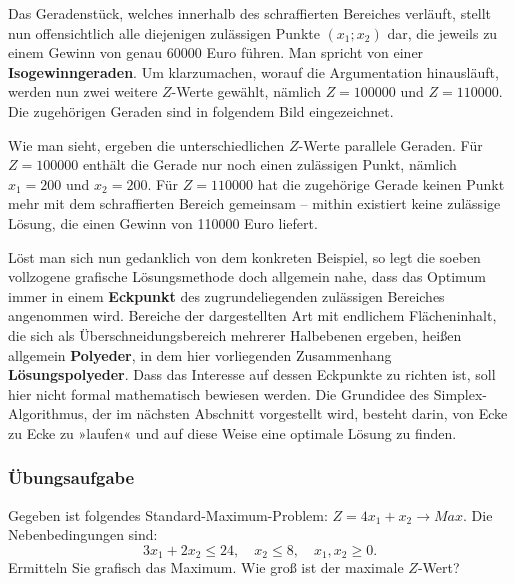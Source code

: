 Das Geradenstück, welches innerhalb des schraffierten Bereiches verläuft, stellt nun offensichtlich alle diejenigen zulässigen Punkte $(x_1; x_2)$ dar, die jeweils zu einem Gewinn von genau 60000 Euro führen. Man spricht von einer \textbf{Isogewinngeraden}. Um klarzumachen, worauf die Argumentation hinausläuft, werden nun zwei weitere $Z$-Werte gewählt, nämlich $Z = 100000$ und $Z = 110000$. Die zugehörigen Geraden sind in folgendem Bild eingezeichnet.

Wie man sieht, ergeben die unterschiedlichen $Z$-Werte parallele Geraden. Für $Z = 100000$ enthält die Gerade nur noch einen zulässigen Punkt, nämlich $x_1 = 200$ und $x_2 = 200$. Für $Z = 110000$ hat die zugehörige Gerade keinen Punkt mehr mit dem schraffierten Bereich gemeinsam -- mithin existiert keine zulässige Lösung, die einen Gewinn von 110000 Euro liefert.

\beispielende

Löst man sich nun gedanklich von dem konkreten Beispiel, so legt die soeben vollzogene grafische Lösungsmethode doch allgemein nahe, dass das Optimum immer in einem \textbf{Eckpunkt} des zugrundeliegenden zulässigen Bereiches angenommen wird. Bereiche der dargestellten Art mit endlichem Flächeninhalt, die sich als Überschneidungsbereich mehrerer Halbebenen ergeben, heißen allgemein \textbf{Polyeder}, in dem hier vorliegenden Zusammenhang \textbf{Lösungspolyeder}. Dass das Interesse auf dessen Eckpunkte zu richten ist, soll hier nicht formal mathematisch bewiesen werden. Die Grundidee des Simplex-Algorithmus, der im nächsten Abschnitt vorgestellt wird, besteht darin, von Ecke zu Ecke zu »laufen« und auf diese Weise eine optimale Lösung zu finden.

\subsubsection{Übungsaufgabe}

\begin{graukasten}
  Gegeben ist folgendes Standard-Maximum-Problem: $Z = 4x_1 + x_2 \rightarrow Max$. Die Nebenbedingungen sind:
  \[ 3x_1 + 2x_2 \leq 24, \quad x_2 \leq 8, \quad x_1, x_2 \geq 0 . \]
  Ermitteln Sie grafisch das Maximum. Wie groß ist der maximale $Z$-Wert?
\end{graukasten}

